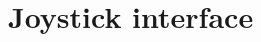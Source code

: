 \documentclass[Orbiter User Manual.tex]{subfiles}
\begin{document}
\section{Joystick interface}

\end{document}
